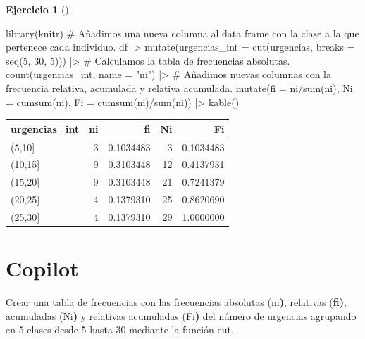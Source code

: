 \documentclass[
  a4paper,
]{scrreport}
\newenvironment{Shaded}{\begin{snugshade}}{\end{snugshade}}
\newcommand{\AttributeTok}[1]{\textcolor[rgb]{0.40,0.45,0.13}{#1}}
\newcommand{\CommentTok}[1]{\textcolor[rgb]{0.37,0.37,0.37}{#1}}
\newcommand{\ControlFlowTok}[1]{\textcolor[rgb]{0.00,0.23,0.31}{\textbf{#1}}}
\newcommand{\DecValTok}[1]{\textcolor[rgb]{0.68,0.00,0.00}{#1}}
\newcommand{\ErrorTok}[1]{\textcolor[rgb]{0.68,0.00,0.00}{#1}}
\newcommand{\ExtensionTok}[1]{\textcolor[rgb]{0.00,0.23,0.31}{#1}}
\newcommand{\FunctionTok}[1]{\textcolor[rgb]{0.28,0.35,0.67}{#1}}
\newcommand{\KeywordTok}[1]{\textcolor[rgb]{0.00,0.23,0.31}{\textbf{#1}}}
\newcommand{\NormalTok}[1]{\textcolor[rgb]{0.00,0.23,0.31}{#1}}
\newcommand{\SpecialCharTok}[1]{\textcolor[rgb]{0.37,0.37,0.37}{#1}}
\newcommand{\StringTok}[1]{\textcolor[rgb]{0.13,0.47,0.30}{#1}}
\theoremstyle{definition}
\newtheorem{exercise}{Ejercicio}[chapter]
\theoremstyle{remark}
\begin{document}
\begin{exercise}[]
\begin{enumerate}
\begin{tcolorbox}
\begin{Shaded}
\begin{Highlighting}[]
\FunctionTok{library}\NormalTok{(knitr)}
\CommentTok{\# Añadimos una nueva columna al data frame con la clase a la que pertenece cada individuo.}
\NormalTok{df }\SpecialCharTok{|\textgreater{}} \FunctionTok{mutate}\NormalTok{(}\AttributeTok{urgencias\_int =} \FunctionTok{cut}\NormalTok{(urgencias, }\AttributeTok{breaks =} \FunctionTok{seq}\NormalTok{(}\DecValTok{5}\NormalTok{, }\DecValTok{30}\NormalTok{, }\DecValTok{5}\NormalTok{))) }\SpecialCharTok{|\textgreater{}} 
    \CommentTok{\# Calculamos la tabla de frecuencias absolutas.}
    \FunctionTok{count}\NormalTok{(urgencias\_int, }\AttributeTok{name =} \StringTok{"ni"}\NormalTok{) }\SpecialCharTok{|\textgreater{}}
    \CommentTok{\# Añadimos nuevas columnas con la frecuencia relativa, acumulada y relativa acumulada.}
    \FunctionTok{mutate}\NormalTok{(}\AttributeTok{fi =}\NormalTok{ ni}\SpecialCharTok{/}\FunctionTok{sum}\NormalTok{(ni), }\AttributeTok{Ni =} \FunctionTok{cumsum}\NormalTok{(ni), }\AttributeTok{Fi =} \FunctionTok{cumsum}\NormalTok{(ni)}\SpecialCharTok{/}\FunctionTok{sum}\NormalTok{(ni)) }\SpecialCharTok{|\textgreater{}}
    \FunctionTok{kable}\NormalTok{()}
\end{Highlighting}
\end{Shaded}

  \begin{longtable}[]{@{}lrrrr@{}}
  \toprule\noalign{}
  urgencias\_int & ni & fi & Ni & Fi \\
  \midrule\noalign{}
  \endhead
  \bottomrule\noalign{}
  \endlastfoot
  (5,10{]} & 3 & 0.1034483 & 3 & 0.1034483 \\
  (10,15{]} & 9 & 0.3103448 & 12 & 0.4137931 \\
  (15,20{]} & 9 & 0.3103448 & 21 & 0.7241379 \\
  (20,25{]} & 4 & 0.1379310 & 25 & 0.8620690 \\
  (25,30{]} & 4 & 0.1379310 & 29 & 1.0000000 \\
  \end{longtable}

  \section{Copilot}

\begin{Shaded}
\begin{Highlighting}[]
\ExtensionTok{Crear}\NormalTok{ una tabla de frecuencias con las frecuencias absolutas }\ErrorTok{(}\ExtensionTok{ni}\KeywordTok{)}\ExtensionTok{,}\NormalTok{ relativas  }\ErrorTok{(}\ControlFlowTok{fi}\KeywordTok{)}\ExtensionTok{,}\NormalTok{ acumuladas }\ErrorTok{(}\ExtensionTok{Ni}\KeywordTok{)} \ExtensionTok{y}\NormalTok{ relativas acumuladas }\ErrorTok{(}\ExtensionTok{Fi}\KeywordTok{)} \ExtensionTok{del}\NormalTok{ número de urgencias agrupando en 5 clases desde 5 hasta 30 mediante la función cut.}
\end{Highlighting}
\end{Shaded}


\end{tcolorbox}
\end{enumerate}
\end{exercise}
\end{document}
